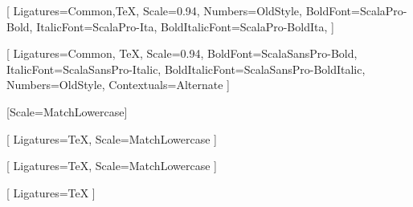 %



\setmainfont{ScalaPro}[
    Ligatures={Common,TeX},
    Scale=0.94, %
    Numbers={OldStyle},
    BoldFont=ScalaPro-Bold,
    ItalicFont=ScalaPro-Ita,
    BoldItalicFont=ScalaPro-BoldIta,
]

\setsansfont{ScalaSansPro-Regular}[
    Ligatures={Common, TeX},
    Scale=0.94,
    BoldFont=ScalaSansPro-Bold,
    ItalicFont=ScalaSansPro-Italic,
    BoldItalicFont=ScalaSansPro-BoldItalic,
    Numbers={OldStyle},
    Contextuals={Alternate}
]

\setmonofont{Iosevka}[Scale=MatchLowercase]

[
    Ligatures=TeX,
    Scale=MatchLowercase
]

\setmathfontface{}[
    Ligatures=TeX,
    Scale=MatchLowercase
]
\setoperatorfont\mathoper

\newfontface{}[
    Ligatures=TeX
]

